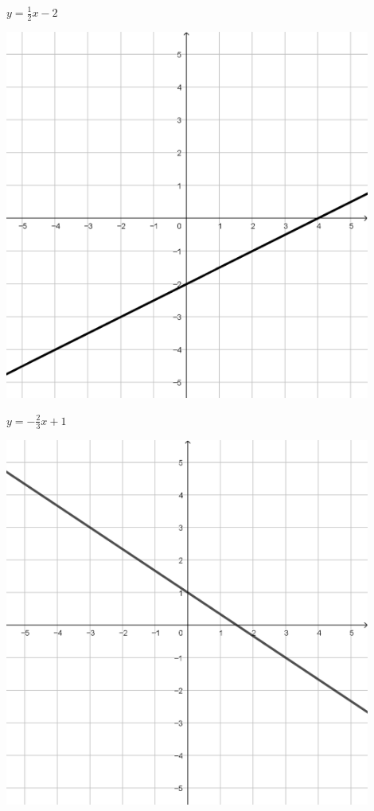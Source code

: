 \documentclass{oblivoir}
\begin{document}
\begin{minipage}{0.45\textwidth}
\begin{minipage}{0.45\textwidth}
\end{minipage}\bigskip\bigskip\par
\begin{minipage}{0.45\textwidth}\centering
\(y=\frac12x-2\)
\par\bigskip\includegraphics[width=0.9\textwidth]{L05}
\end{minipage}
\begin{minipage}{0.45\textwidth}\centering
\(y=-\frac23x+1\)
\par\bigskip\includegraphics[width=0.9\textwidth]{L06}
\end{minipage}\bigskip\bigskip\par
\end{minipage}
\end{document}

